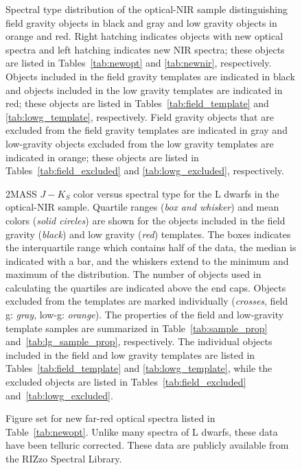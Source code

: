 \documentclass[12pt,preprint]{aastex}
\begin{document}
\begin{figure}
		\caption{Spectral type distribution of the optical-NIR sample distinguishing field gravity objects in black and gray and low gravity objects in orange and red.	 
		Right hatching indicates objects with new optical spectra and left hatching indicates new NIR spectra; these objects are listed in Tables~\ref{tab:newopt} and \ref{tab:newnir}, respectively.
		Objects included in the field gravity templates are indicated in black and objects included in the low gravity templates are indicated in red; these objects are listed in Tables~\ref{tab:field_template} and \ref{tab:lowg_template}, respectively.
		Field gravity objects that are excluded from the field gravity templates are indicated in gray and low-gravity objects excluded from the low gravity templates are indicated in orange; these objects are listed in Tables~\ref{tab:field_excluded} and \ref{tab:lowg_excluded}, respectively.}
	\label{fig:spthist}
\end{figure}

\begin{figure}
		\caption{2MASS $J-K_S$ color versus spectral type for the L dwarfs in the optical-NIR sample. 
		Quartile ranges (\emph{box and whisker}) and mean colors (\emph{solid circles}) are shown for the objects included in the field gravity (\emph{black}) and low gravity (\emph{red}) templates. The boxes indicates the interquartile range which contains half of the data, the median is indicated with a bar, and the whiskers extend to the minimum and maximum of the distribution. The number of objects used in calculating the quartiles are indicated above the end caps.
		Objects excluded from the templates are marked individually (\emph{crosses}, field g: \emph{gray}, low-g: \emph{orange}).
		The properties of the field and low-gravity template samples are summarized in Table~\ref{tab:sample_prop} and~\ref{tab:lg_sample_prop}, respectively. The individual objects included in the field and low gravity templates are listed in Tables~\ref{tab:field_template} and \ref{tab:lowg_template}, while the excluded objects are listed in Tables~\ref{tab:field_excluded} and~\ref{tab:lowg_excluded}.}
	\label{fig:JK_colors}
\end{figure}

\begin{figure}
	\caption{Figure set for new far-red optical spectra listed in Table~\ref{tab:newopt}. Unlike many spectra of L dwarfs, these data have been telluric corrected. These data are publicly available from the RIZzo Spectral Library.}
		\label{fig:newopt}
\end{figure}
\end{document}
